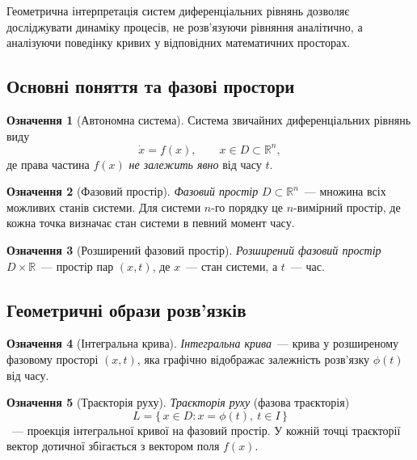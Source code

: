 \documentclass[12pt,a4paper]{article}
\theoremstyle{definition}
\newtheorem{ozn}{Означення}[section]
\theoremstyle{plain}
\begin{document}
Геометрична інтерпретація систем диференціальних рівнянь дозволяє
досліджувати динаміку процесів, не розв'язуючи рівняння аналітично, а
аналізуючи поведінку кривих у відповідних математичних просторах.

\subsection{Основні поняття та фазові простори}

\begin{ozn}[Автономна система]
Система звичайних диференціальних рівнянь виду
\begin{equation}
  \dot x = f(x), \qquad x \in D \subset \mathbb{R}^n,
\end{equation}
де права частина $f(x)$ \emph{не залежить явно} від часу $t$.
\end{ozn}

\begin{ozn}[Фазовий простір]
\emph{Фазовий простір} $D \subset \mathbb{R}^n$~--- множина всіх можливих
станів системи. Для системи $n$-го порядку це $n$-вимірний простір, де
кожна точка визначає стан системи в певний момент часу.
\end{ozn}

\begin{ozn}[Розширений фазовий простір]
\emph{Розширений фазовий простір} $D \times \mathbb{R}$~--- простір пар
$(x,t)$, де $x$~--- стан системи, а $t$~--- час.
\end{ozn}

\subsection{Геометричні образи розв'язків}

\begin{ozn}[Інтегральна крива]
\emph{Інтегральна крива}~--- крива у розширеному фазовому просторі
$(x,t)$, яка графічно відображає залежність розв'язку $\phi(t)$ від часу.
\end{ozn}

\begin{ozn}[Траєкторія руху]
\emph{Траєкторія руху} (фазова траєкторія)
\begin{equation}
  L = \{\,x \in D : x = \phi(t),\ t \in I\,\}
\end{equation}
~--- проекція інтегральної кривої на фазовий простір. У кожній точці
траєкторії вектор дотичної збігається з вектором поля $f(x)$.
\end{ozn}
\end{document}
